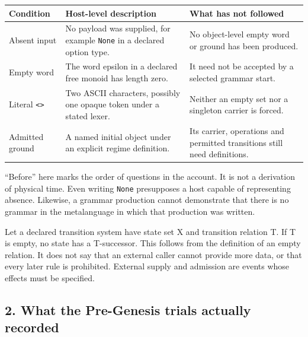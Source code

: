 \documentclass[
  11pt,
]{article}
\begin{document}
\begin{longtable}[]{@{}
  >{\raggedright\arraybackslash}p{}
  >{\raggedright\arraybackslash}p{}
  >{\raggedright\arraybackslash}p{}@{}}
\toprule\noalign{}
\begin{minipage}[b]{\linewidth}\raggedright
Condition
\end{minipage} & \begin{minipage}[b]{\linewidth}\raggedright
Host-level description
\end{minipage} & \begin{minipage}[b]{\linewidth}\raggedright
What has not followed
\end{minipage} \\
\midrule\noalign{}
\endhead
\bottomrule\noalign{}
\endlastfoot
Absent input & No payload was supplied, for example \nolinkurl{None} in a
declared option type. & No object-level empty word or ground has been
produced. \\
Empty word & The word epsilon in a declared free monoid has length zero.
& It need not be accepted by a selected grammar start. \\
Literal \texttt{\textless{}\textgreater{}} & Two ASCII characters,
possibly one opaque token under a stated lexer. & Neither an empty set
nor a singleton carrier is forced. \\
Admitted ground & A named initial object under an explicit regime
definition. & Its carrier, operations and permitted transitions still
need definitions. \\
\end{longtable}

``Before'' here marks the order of questions in the account. It is not a
derivation of physical time. Even writing \nolinkurl{None} presupposes a
host capable of representing absence. Likewise, a grammar production
cannot demonstrate that there is no grammar in the metalanguage in which
that production was written.

Let a declared transition system have state set X and transition
relation T. If T is empty, no state has a T-successor. This follows from
the definition of an empty relation. It does not say that an external
caller cannot provide more data, or that every later rule is prohibited.
External supply and admission are events whose effects must be
specified.

\subsection{2. What the Pre-Genesis trials actually
recorded}\label{what-the-pre-genesis-trials-actually-recorded}
\end{document}
